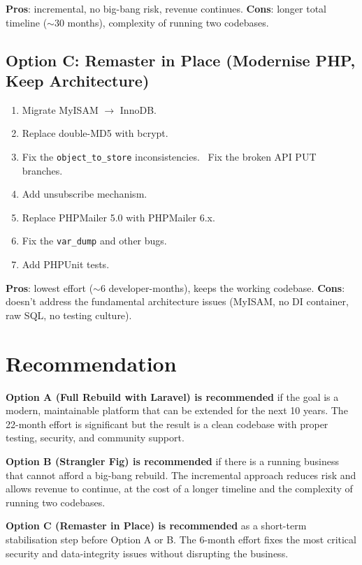 \documentclass[11pt,a4paper]{article}
\begin{document}
\textbf{Pros}: incremental, no big-bang risk, revenue continues.
\textbf{Cons}: longer total timeline ($\sim$30 months), complexity
of running two codebases.

\subsection{Option C: Remaster in Place (Modernise PHP, Keep Architecture)}

\begin{enumerate}[leftmargin=1.6em,itemsep=2pt]
  \item Migrate MyISAM $\to$ InnoDB.
  \item Replace double-MD5 with bcrypt.
  \item Fix the \texttt{object\_to\_store} inconsistencies.
  \   Fix the broken API PUT branches.
  \item Add unsubscribe mechanism.
  \item Replace PHPMailer 5.0 with PHPMailer 6.x.
  \item Fix the \texttt{var\_dump} and other bugs.
  \item Add PHPUnit tests.
\end{enumerate}

\textbf{Pros}: lowest effort ($\sim$6 developer-months), keeps the
working codebase.
\textbf{Cons}: doesn't address the fundamental architecture issues
(MyISAM, no DI container, raw SQL, no testing culture).

\section{Recommendation}\label{sec:recommendation}

\textbf{Option A (Full Rebuild with Laravel) is recommended} if the
goal is a modern, maintainable platform that can be extended for the
next 10 years. The 22-month effort is significant but the result is
a clean codebase with proper testing, security, and community support.

\textbf{Option B (Strangler Fig) is recommended} if there is a
running business that cannot afford a big-bang rebuild. The
incremental approach reduces risk and allows revenue to continue,
at the cost of a longer timeline and the complexity of running two
codebases.

\textbf{Option C (Remaster in Place) is recommended} as a short-term
stabilisation step before Option A or B. The 6-month effort fixes
the most critical security and data-integrity issues without
disrupting the business.
\end{document}
